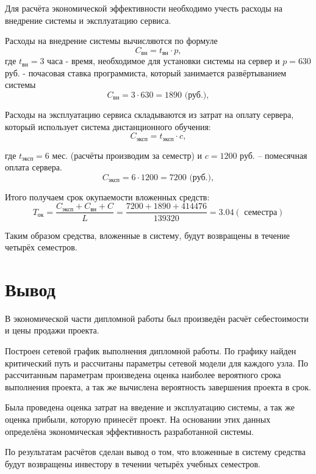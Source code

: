 Для расчёта экономической эффективности необходимо учесть расходы на внедрение системы и эксплуатацию сервиса.

Расходы на внедрение системы  вычисляются по формуле 
$$
C_{\mbox{вн}} = t_{\mbox{вн}}\cdot p,
$$
где $t_{\mbox{вн}} = 3$ часа - время, необходимое для установки системы на сервер и $p=630$ руб. - почасовая ставка программиста, который занимается развёр\-тыванием системы
$$
C_{\mbox{вн}} = 3 \cdot 630 = 1890 \mbox{ (руб.)},
$$

Расходы на эксплуатацию сервиса складываются из затрат на оплату сервера, который использует система дистанционного обучения:
$$
C_{\mbox{эксп}} = t_{\mbox{эксп}}\cdot c,
$$

где $t_{\mbox{эксп}} = 6$ мес. (расчёты производим за семестр) и  $c = 1200$ руб. – помесячная оплата сервера.
$$
C_{\mbox{эксп}} = 6 \cdot 1200 = 7200 \mbox{ (руб.)},
$$ 

Итого получаем срок окупаемости вложенных средств:
$$
T_{\mbox{ок}} = \frac{C_{\mbox{эксп}} + C_{\mbox{вн}} + C}{L} = \frac{7200+1890+414476}{139320} = 3.04 (\mbox{ семестра})
$$

Таким образом средства, вложенные в систему, будут возвращены в течение четырёх семестров.

\section{Вывод} 
В экономической части дипломной работы был произведён расчёт себес\-тоимости и цены продажи проекта.

Построен сетевой график выполнения дипломной работы. По графику найден критический путь и рассчитаны параметры сетевой модели для каждо\-го узла. По рассчитанным параметрам произведена оценка наиболее вероят\-ного срока выполнения проекта, а так же вычислена вероятность завершения проекта в срок.

Была проведена оценка затрат на введение и эксплуатацию системы, а так же оценка прибыли, которую принесёт проект. На основании этих данных определёна экономическая эффективность разработанной системы.

По результатам расчётов сделан вывод о том, что вложенные в систему средства будут возвращены инвестору в течении четырёх учебных семестров.